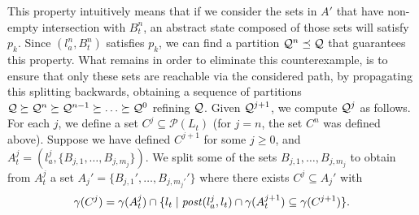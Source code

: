 This property intuitively means that if we consider the sets in $A'$ that have non-empty intersection with $B_t^n$, an abstract state composed of those sets will satisfy $p_k$. Since $(l_a^n,B_t^n)$ satisfies $p_k$, we can find a partition $\mathcal{Q}^n \preceq \mathcal{Q}$ that guarantees this property. What remains in order to eliminate this counterexample, is to ensure that only these sets are reachable via the considered path, by propagating this splitting backwards, obtaining a sequence of partitions $\mathcal{Q} \succeq \mathcal{Q}^n \succeq \mathcal{Q}^{n-1} \succeq \ldots \succeq \mathcal{Q}^0$ refining $\mathcal{Q}$. Given $\mathcal{Q}^{j+1}$, we compute $\mathcal{Q}^j$ as follows. For each $j$, we define a set $C^j \subseteq \mathcal{P}(L_t)$ (for $j=n$, the set $C^n$ was defined above). Suppose we have defined $C^{j+1}$ for some $j \geq 0$, and $A_t^j = (l_a^j,\{B_{j,1},\ldots,B_{j,m_j}\})$. We split some of the sets $B_{j,1},\ldots,B_{j,m_j}$ to obtain from $A_t^j$ a set $A_j' = \{B_{j,1}',\ldots,B_{j,m_j'}'\}$ where there exists $C^j \subseteq A_j'$ with
\[\gamma(C^j) = \gamma(A_t^j) \cap \{l_t \mid \mathit{post}(l_a^j,l_t) \cap \gamma(A_t^{j+1}) \subseteq \gamma(C^{j+1})\}.\] 
